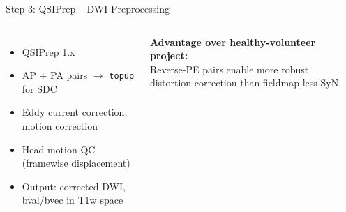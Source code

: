 \begin{frame}{Step 3: QSIPrep -- DWI Preprocessing}

  \begin{columns}[T]
    \begin{itemize}
      \item QSIPrep 1.x \cite{Cieslak2021}
      \item AP + PA pairs $\to$ \texttt{topup} for SDC
      \item Eddy current correction, motion correction
      \item Head motion QC (framewise displacement)
      \item Output: corrected DWI, bval/bvec in T1w space
    \end{itemize}

    \bigskip

    \textbf{Advantage over healthy-volunteer project:}\\
    Reverse-PE pairs enable more robust distortion correction
    than fieldmap-less SyN.

    \begin{center}
    \end{center}
  \end{columns}

\end{frame}


